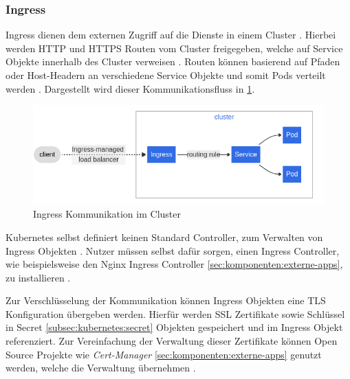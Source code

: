 \subsubsection{Ingress}
\label{subsec:kubernetes:ingress}
Ingress dienen dem externen Zugriff auf die Dienste in einem Cluster \cite{kubernetesIngress}.
Hierbei werden HTTP und HTTPS Routen vom Cluster freigegeben, 
welche auf Service Objekte innerhalb des Cluster verweisen \cite{kubernetesIngress}.
Routen können basierend auf Pfaden oder Host-Headern an verschiedene Service Objekte und somit Pods verteilt werden \cite{kubernetesIngress}.
Dargestellt wird dieser Kommunikationsfluss in \ref{fig:ingress_communication}.

\begin{figure}[h]
  \centering
  \includegraphics[width=\textwidth]{gfx/chapters/2_grundlagen/ingress.png}
  \caption{Ingress Kommunikation im Cluster}
  \label{fig:ingress_communication}
\end{figure}

Kubernetes selbst definiert keinen Standard Controller, zum Verwalten von Ingress Objekten \cite{Burns2019}.
Nutzer müssen selbst dafür sorgen, einen Ingress Controller, 
wie beispielsweise den Nginx Ingress Controller \ref{sec:komponenten:externe-apps}, zu installieren \cite{Burns2019}.

Zur Verschlüsselung der Kommunikation können Ingress Objekten eine TLS Konfiguration übergeben werden.
Hierfür werden SSL Zertifikate sowie Schlüssel in Secret \ref{subsec:kubernetes:secret} Objekten gespeichert und im
Ingress Objekt referenziert. 
Zur Vereinfachung der Verwaltung dieser Zertifikate können Open Source Projekte wie \emph{Cert-Manager} \ref{sec:komponenten:externe-apps}
genutzt werden, welche die Verwaltung übernehmen \cite{Burns2019}.